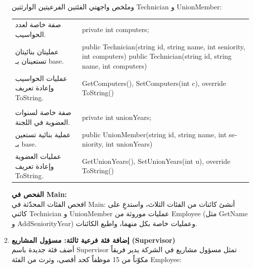 \documentclass[14pt]{extarticle}
\begin{document}
\begin{enumerate}[resume, label=\textbf{تمرين \arabic*:}, wide=0pt, leftmargin=*, itemsep=2em]
\vspace{2em}

\clearpage
    وملخص واجهتي الفئتين الفرعيتين الوارثتين \textenglish{Technician} و \textenglish{UnionMember}:

    {\centering
    \renewcommand{\arraystretch}{1.2}
    \small
    \begin{tabular}{|>{\raggedleft\arraybackslash}p{}|>{\raggedright\arraybackslash}p{}|}
    \hline
    \multicolumn{2}{|c|}{\textbf{الفئة الفرعية: \textenglish{Technician : Employee}}} \\
    \hline
    صفة خاصة لعدد الحواسيب. & \textenglish{private int computers;} \\
    \hline
    عمليتان بنائيتان تستعينان بـ \textenglish{base}. & \textenglish{public Technician(string id, string name, int seniority, int computers)} \newline \textenglish{public Technician(string id, string name, int computers)} \\
    \hline
    عمليات الحواسيب وإعادة تعريف \textenglish{ToString}. & \textenglish{GetComputers(), SetComputers(int c), override ToString()} \\
    \hline
    \multicolumn{2}{|c|}{\textbf{الفئة الفرعية: \textenglish{UnionMember : Employee}}} \\
    \hline
    صفة خاصة لسنوات العضوية في اللجنة. & \textenglish{private int unionYears;} \\
    \hline
    عملية بنائية تستعين بـ \textenglish{base}. & \textenglish{public UnionMember(string id, string name, int seniority, int unionYears)} \\
    \hline
    عمليات العضوية وإعادة تعريف \textenglish{ToString}. & \textenglish{GetUnionYears(), SetUnionYears(int u), override ToString()} \\
    \hline
    \end{tabular}
    \par} %

    \vspace{2em}

    \textbf{الفحص في \textenglish{Main}:} \\
    افحص الفئات المحدّثة في \textenglish{Main}: أنشئ كائنات من الفئات الثلاث، واستدعِ على كائني \textenglish{Technician} و \textenglish{UnionMember} عمليات موروثة من \textenglish{Employee} (مثل \textenglish{GetName} و \textenglish{AddSeniorityYear}) وعمليات خاصة بكل منهما، واطبع الكائنات.

\clearpage
    \item \textbf{إضافة فئة فرعية ثالثة: مسؤول المشاريع (\textenglish{Supervisor})} \\
    أضف فئة جديدة باسم \textenglish{Supervisor} تمثل مسؤول مشاريع في الشركة يدير فريقاً مكوّناً من 15 موظفاً كحد أقصى، وترث من الفئة \textenglish{Employee}:


\end{enumerate}
\end{document}
